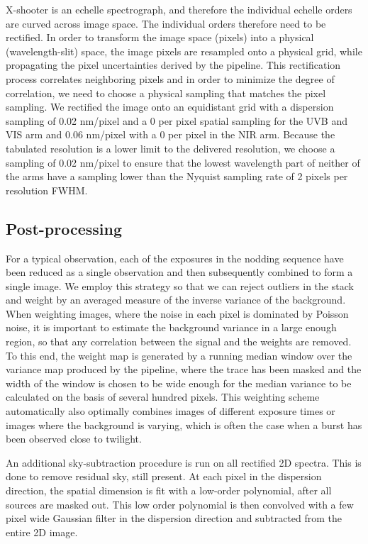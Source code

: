 \documentclass[longauth]{aa}    %
\begin{document}
X-shooter is an echelle spectrograph, and therefore the individual echelle
orders are curved across image space. The individual orders therefore need to be
rectified. In order to transform the image space (pixels) into a physical
(wavelength-slit) space, the image pixels are resampled onto a physical grid,
while propagating the pixel uncertainties derived by the pipeline. This
rectification  process correlates neighboring pixels and in order to minimize
the degree of correlation, we need to choose a physical sampling that matches
the pixel sampling. We rectified the image onto an equidistant grid with a
dispersion sampling of 0.02 nm/pixel and a 0 per pixel spatial sampling
for the UVB and VIS arm and 0.06 nm/pixel with a 0 per pixel in the NIR
arm.  Because the tabulated resolution is a lower limit to the delivered
resolution, we choose a sampling of 0.02 nm/pixel to ensure that the lowest
wavelength part of neither of the arms have a sampling lower than the Nyquist
sampling rate of 2 pixels per resolution FWHM.

\subsection{Post-processing} \label{postproc}

For a typical observation, each of the exposures in the nodding sequence have
been reduced as a single observation and then subsequently combined to form a
single image. We employ this strategy so that we can reject outliers in the
stack and weight by an averaged measure of the inverse variance of the
background. When weighting images, where the noise in each pixel is dominated by
Poisson noise, it is important to estimate the background variance in a large
enough region, so that any correlation between the signal and the weights are
removed. To this end, the weight map is generated by a running median window
over the variance map produced by the pipeline, where the trace has been masked
and the width of the window is chosen to be wide enough for the median variance to
be calculated on the basis of several hundred pixels. This weighting scheme
automatically also optimally combines images of different exposure times or
images where the background is varying, which is often the case when a burst has
been observed close to twilight.

An additional sky-subtraction procedure is run on all rectified 2D spectra.
This is done to remove residual sky, still present. At each pixel in the
dispersion direction, the spatial dimension is fit with a low-order polynomial,
after all sources are masked out. This low order polynomial is then convolved
with a few pixel wide Gaussian filter in the dispersion direction and subtracted
from the entire 2D image.
\end{document}
